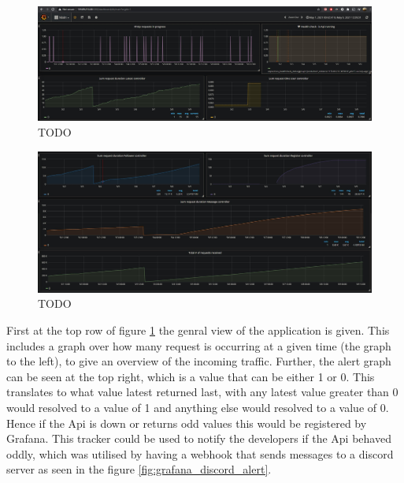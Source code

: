 \documentclass[report/main.tex]{subfiles}
\begin{document}
                \begin{figure}[H]
                    \centering
                    \includegraphics[width=\textwidth]{report/images/Grafana EvilTwitter 1.jpg}
                    \caption{TODO}
                    \label{fig:grafana_setup_1}
                \end{figure}
                
                \begin{figure}[H]
                    \centering
                    \includegraphics[width=\textwidth]{report/images/Grafana EvilTwitter 2.jpg}
                    \caption{TODO}
                    \label{fig:grafana_setup_2}
                \end{figure}
            
                First at the top row of figure \ref{fig:grafana_setup_1} the genral view of the application is given. This includes a graph over how many request is occurring at a given time (the graph to the left), to give an overview of the incoming traffic. Further, the alert graph can be seen at the top right, which is a value that can be either 1 or 0. This translates to what value latest returned last, with any latest value greater than 0 would resolved to a value of 1 and anything else would resolved to a value of 0. Hence if the Api is down or returns odd values this would be registered by Grafana. This tracker could be used to notify the developers if the Api behaved oddly, which was utilised by having a webhook that sends messages to a discord server as seen in the figure \ref{fig:grafana_discord_alert}.
                
\end{document}
